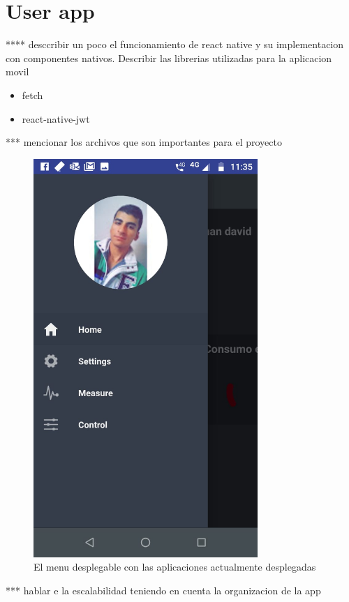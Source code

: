 \section{User app}

**** desccribir un poco el funcionamiento de react native y su implementacion con componentes nativos. Describir las librerias utilizadas para la aplicacion movil

\begin{itemize}
	\item fetch
	\item react-native-jwt
\end{itemize}

*** mencionar los archivos que son importantes para el proyecto


\begin{figure}[htbp]
	\centerline{\includegraphics[width=8.5cm]{./figuras/mobile_menu.jpeg}}
	\caption{El menu desplegable con las aplicaciones actualmente desplegadas}
	\label{fig_17}
\end{figure}

*** hablar e la escalabilidad teniendo en cuenta la organizacion de la app



